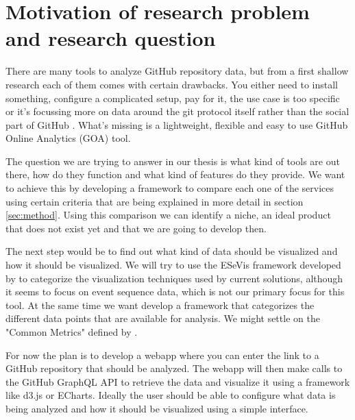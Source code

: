 \documentclass[authoryear,preprint,review,12pt]{elsarticle}
\begin{document}
\begin{frontmatter}

\end{frontmatter}


\section{Motivation of research problem and research question}
\label{sec:motivation}

There are many tools to analyze GitHub repository data, but from a first shallow research each of
them comes with certain drawbacks. You either need to install something, configure a complicated
setup, pay for it, the use case is too specific or it's focussing more on data around the git
protocol itself rather than the social part of GitHub . What's missing is a lightweight, flexible
and easy to use GitHub Online Analytics (GOA) tool.

The question we are trying to answer in our thesis is what kind of tools are out there, how do they
function and what kind of features do they provide. We want to achieve this by developing a
framework to compare each one of the services using certain criteria that are being explained in
more detail in section \ref{sec:method}. Using this comparison we can identify a niche, an ideal
product that does not exist yet and that we are going to develop then.

The next step would be to find out what kind of data should be visualized and how it should be
visualized. We will try to use the ESeVis framework developed by
\citet{yeshchenkoSurveyApproachesEvent2022} to categorize the visualization techniques used by
current solutions, although it seems to focus on event sequence data, which is not our primary
focus for this tool. At the same time we want develop a framework that categorizes the different
data points that are available for analysis. We might settle on the "Common Metrics" defined by
\citet{CHAOSSCommonMetrics2022}.

For now the plan is to develop a webapp where you can enter the link to a GitHub repository that
should be analyzed. The webapp will then make calls to the GitHub GraphQL API to retrieve the data
and visualize it using a framework like d3.js or ECharts. Ideally the user should be able to
configure what data is being analyzed and how it should be visualized using a simple interface.
\end{document}
